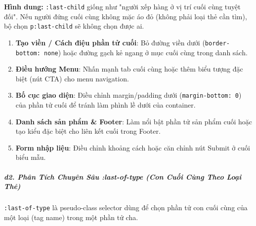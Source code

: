 \documentclass[11pt,oneside]{book}
\newcommand{\codeinline}[1]{\textcolor{accentOrange}{\texttt{#1}}}
\begin{document}
\begin{tipBox}
\textbf{Hình dung:} \codeinline{:last-child} giống như "người xếp hàng ở vị trí cuối cùng tuyệt đối". Nếu người đứng cuối cùng không mặc áo đỏ (không phải loại thẻ cần tìm), bộ chọn \codeinline{p:last-child} sẽ không chọn được ai.
\end{tipBox}

\begin{conceptBox}
\begin{enumerate}[leftmargin=1.5em, itemsep=3pt, parsep=0pt]
    \item \textbf{Tạo viền / Cách điệu phần tử cuối}: Bỏ đường viền dưới (\codeinline{border-bottom: none}) hoặc đường gạch kẻ ngang ở mục cuối cùng trong danh sách.
    \item \textbf{Điều hướng Menu}: Nhấn mạnh tab cuối cùng hoặc thêm biểu tượng đặc biệt (nút CTA) cho menu navigation.
    \item \textbf{Bố cục giao diện}: Điều chỉnh margin/padding dưới (\codeinline{margin-bottom: 0}) của phần tử cuối để tránh làm phình lề dưới của container.
    \item \textbf{Danh sách sản phẩm \& Footer}: Làm nổi bật phần tử sản phẩm cuối hoặc tạo kiểu đặc biệt cho liên kết cuối trong Footer.
    \item \textbf{Form nhập liệu}: Điều chỉnh khoảng cách hoặc căn chỉnh nút Submit ở cuối biểu mẫu.
\end{enumerate}
\end{conceptBox}


\subparagraph{d2. Phân Tích Chuyên Sâu :last-of-type (Con Cuối Cùng Theo Loại Thẻ)}

\codeinline{:last-of-type} là pseudo-class selector dùng để chọn phần tử con cuối cùng của một loại (tag name) trong một phần tử cha.
\end{document}
